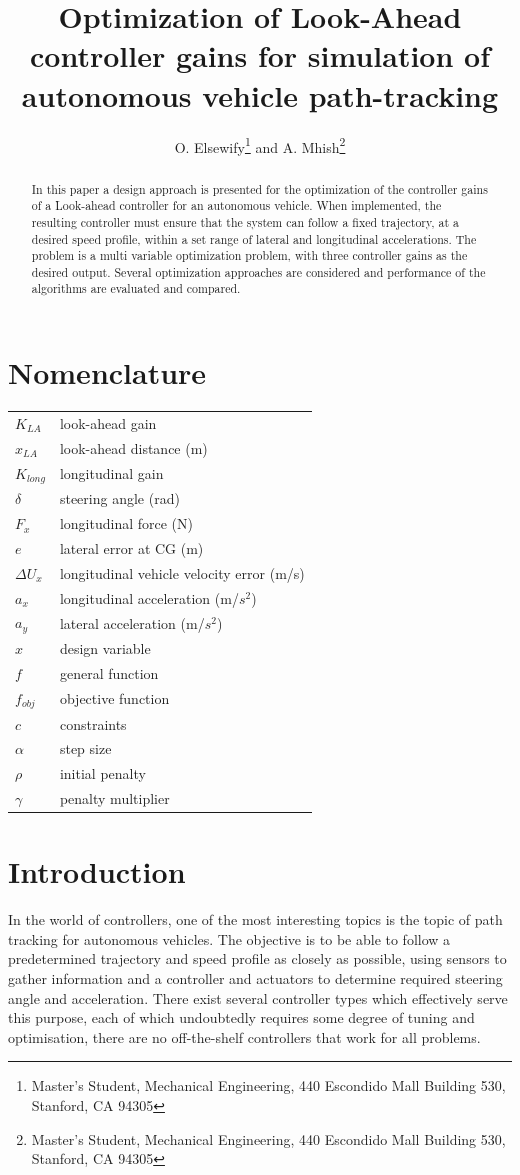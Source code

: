 \documentclass[conf]{new-aiaa}
\title{Optimization of Look-Ahead controller gains for simulation of autonomous vehicle path-tracking}
\author{O. Elsewify\footnote{Master's Student, Mechanical Engineering, 440 Escondido Mall Building 530, Stanford, CA 94305} and A. Mhish\footnote{Master's Student, Mechanical Engineering, 440 Escondido Mall Building 530, Stanford, CA 94305}}
\affil{Stanford University, Stanford, CA, 94305}
\begin{document}
\maketitle

\begin{abstract}
In this paper a design approach is presented for the optimization of the controller gains of a Look-ahead controller for an autonomous vehicle. When implemented, the resulting controller must ensure that the system can follow a fixed trajectory, at a desired speed profile, within a set range of lateral and longitudinal accelerations. The problem is a multi variable optimization problem, with three controller gains as the desired output.
Several optimization approaches are considered and performance of the algorithms are evaluated and compared.
\end{abstract}

\section{Nomenclature}

{\renewcommand\arraystretch{1.0}
\noindent\begin{longtable*}{@{}l @{\quad=\quad} l@{}}
$K_{LA}$ & look-ahead gain \\
$x_{LA}$ & look-ahead distance (m)\\
$K_{long}$& longitudinal gain \\
$\delta$ & steering angle (rad)\\
$F_{x}$ & longitudinal force (N) \\
$e$ & lateral error at CG (m)\\
$\Delta U_x$ & longitudinal vehicle velocity error (m/s)\\
$a_x$ & longitudinal acceleration (m/$s^2$)\\
$a_y$ & lateral acceleration (m/$s^2$)\\
$x$ & design variable \\
$f$ & general function \\
$f_{obj}$   & objective function\\
$c$  & constraints \\
$\alpha$ & step size\\
$\rho$   & initial penalty \\
$\gamma$ & penalty multiplier\\
\end{longtable*}}

\section{Introduction}
In the world of controllers, one of the most interesting topics is the topic of path tracking for autonomous vehicles. The objective is to be able to follow a predetermined trajectory and speed profile as closely as possible, using sensors to gather information and a controller and actuators to determine required steering angle and acceleration. There exist several controller types which effectively serve this purpose, each of which undoubtedly requires some degree of tuning and optimisation, there are no off-the-shelf controllers that work for all problems. 
\end{document}
